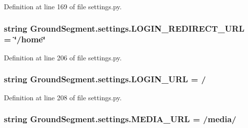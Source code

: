 Definition at line 169 of file settings.\+py.

\hypertarget{namespace_ground_segment_1_1settings_a6d76611e9864bdae4f8766581d7accf7}{}
\subsubsection[{L\+O\+G\+I\+N\+\_\+\+R\+E\+D\+I\+R\+E\+C\+T\+\_\+\+U\+R\+L}]{\setlength{\rightskip}{0pt plus 5cm}string Ground\+Segment.\+settings.\+L\+O\+G\+I\+N\+\_\+\+R\+E\+D\+I\+R\+E\+C\+T\+\_\+\+U\+R\+L = \char`\"{}/home\char`\"{}}\label{namespace_ground_segment_1_1settings_a6d76611e9864bdae4f8766581d7accf7}


Definition at line 206 of file settings.\+py.

\hypertarget{namespace_ground_segment_1_1settings_a9f2c02d37399152c46ed216451c55f9d}{}
\subsubsection[{L\+O\+G\+I\+N\+\_\+\+U\+R\+L}]{\setlength{\rightskip}{0pt plus 5cm}string Ground\+Segment.\+settings.\+L\+O\+G\+I\+N\+\_\+\+U\+R\+L = \textquotesingle{}/\textquotesingle{}}\label{namespace_ground_segment_1_1settings_a9f2c02d37399152c46ed216451c55f9d}


Definition at line 208 of file settings.\+py.

\hypertarget{namespace_ground_segment_1_1settings_a482e3bb1fe2f21c677c69b69e5b5798a}{}
\subsubsection[{M\+E\+D\+I\+A\+\_\+\+U\+R\+L}]{\setlength{\rightskip}{0pt plus 5cm}string Ground\+Segment.\+settings.\+M\+E\+D\+I\+A\+\_\+\+U\+R\+L = \textquotesingle{}/media/\textquotesingle{}}\label{namespace_ground_segment_1_1settings_a482e3bb1fe2f21c677c69b69e5b5798a}


